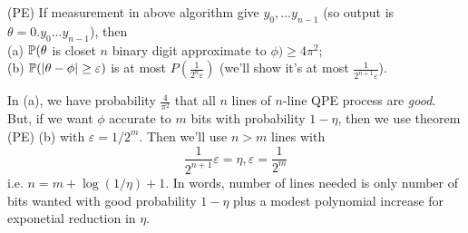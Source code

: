 \documentclass[a4paper]{article}
\begin{document}
\begin{thm} (PE)
    If measurement in above algorithm give $y_0,...y_{n-1}$ (so output is $\theta = 0.y_0...y_{n-1}$), then\\
    (a) $\P(\theta$ is closet $n$ binary digit approximate to $\phi) \geq {4}{\pi^2}$;\\
    (b) $\P(|\theta-\phi| \geq \varepsilon)$ is at most $P(\frac{1}{2^n \varepsilon})$ (we'll show it's at most $\frac{1}{2^{n+1} \varepsilon}$).

    \begin{rem}
        In (a), we have probability $\frac{4}{\pi^2}$ that all $n$ lines of $n$-line QPE process are \emph{good}.\\
        But, if we want $\phi$ accurate to $m$ bits with probability $1-\eta$, then we use theorem (PE) (b) with $\varepsilon = 1/2^m$. Then we'll use $n>m$ lines with
        $$\frac{1}{2^{n+1}} \varepsilon = \eta, \varepsilon = \frac{1}{2^m}$$
        i.e. $n=m+\log(1/\eta)+1$. In words, number of lines needed is only number of bits wanted with good probability $1-\eta$ plus a modest polynomial increase for exponetial reduction in $\eta$.
    \end{rem}


\end{thm}
\end{document}
